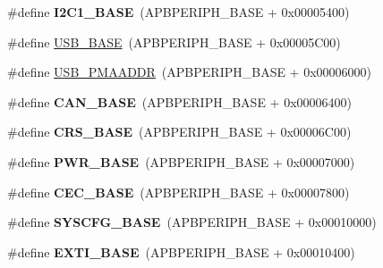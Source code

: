 \begin{DoxyCompactItemize}
\#define {\bfseries I2\+C1\+\_\+\+B\+A\+SE}~(A\+P\+B\+P\+E\+R\+I\+P\+H\+\_\+\+B\+A\+SE + 0x00005400)
\item 
\#define \hyperlink{group___peripheral__memory__map_gaa6c4cbed4ddbb3ecd77de93fab2a2e04}{U\+S\+B\+\_\+\+B\+A\+SE}~(A\+P\+B\+P\+E\+R\+I\+P\+H\+\_\+\+B\+A\+SE + 0x00005\+C00)
\item 
\#define \hyperlink{group___peripheral__memory__map_gaf992dfdd5707568c5cb5506e2347e808}{U\+S\+B\+\_\+\+P\+M\+A\+A\+D\+DR}~(A\+P\+B\+P\+E\+R\+I\+P\+H\+\_\+\+B\+A\+SE + 0x00006000)
\item 
\mbox{\label{group___peripheral__memory__map_gacbe030cda8eb3031d55a759612a9042d}} 
\#define {\bfseries C\+A\+N\+\_\+\+B\+A\+SE}~(A\+P\+B\+P\+E\+R\+I\+P\+H\+\_\+\+B\+A\+SE + 0x00006400)
\item 
\mbox{\label{group___peripheral__memory__map_ga53cd25310ec0663a7395042bd860fedc}} 
\#define {\bfseries C\+R\+S\+\_\+\+B\+A\+SE}~(A\+P\+B\+P\+E\+R\+I\+P\+H\+\_\+\+B\+A\+SE + 0x00006\+C00)
\item 
\mbox{\label{group___peripheral__memory__map_gac691ec23dace8b7a649a25acb110217a}} 
\#define {\bfseries P\+W\+R\+\_\+\+B\+A\+SE}~(A\+P\+B\+P\+E\+R\+I\+P\+H\+\_\+\+B\+A\+SE + 0x00007000)
\item 
\mbox{\label{group___peripheral__memory__map_gaacb77bc44b3f8c87ab98f241e760e440}} 
\#define {\bfseries C\+E\+C\+\_\+\+B\+A\+SE}~(A\+P\+B\+P\+E\+R\+I\+P\+H\+\_\+\+B\+A\+SE + 0x00007800)
\item 
\mbox{\label{group___peripheral__memory__map_ga62246020bf3b34b6a4d8d0e84ec79d3d}} 
\#define {\bfseries S\+Y\+S\+C\+F\+G\+\_\+\+B\+A\+SE}~(A\+P\+B\+P\+E\+R\+I\+P\+H\+\_\+\+B\+A\+SE + 0x00010000)
\item 
\mbox{\label{group___peripheral__memory__map_ga87371508b3bcdcd98cd1ec629be29061}} 
\#define {\bfseries E\+X\+T\+I\+\_\+\+B\+A\+SE}~(A\+P\+B\+P\+E\+R\+I\+P\+H\+\_\+\+B\+A\+SE + 0x00010400)
\item 
\mbox{\label{group___peripheral__memory__map_ga695c9a2f892363a1c942405c8d351b91}} 

\end{DoxyCompactItemize}
